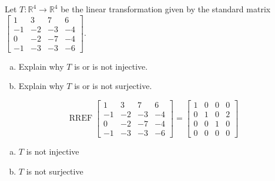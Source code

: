 
\begin{exerciseStatement}
 Let \(T:\mathbb{R}^ 4  \to \mathbb{R}^ 4 \) be the linear transformation given by the standard matrix \( \left[\begin{array}{cccc}
1 & 3 & 7 & 6 \\
-1 & -2 & -3 & -4 \\
0 & -2 & -7 & -4 \\
-1 & -3 & -3 & -6
\end{array}\right] .\)
\begin{enumerate}[(a)]
\item Explain why \(T\) is or is not injective.
\item Explain why \(T\) is or is not surjective.
\end{enumerate}
    
\end{exerciseStatement}
    
\begin{exerciseAnswer} 


\[\operatorname{RREF} \left[\begin{array}{cccc}
1 & 3 & 7 & 6 \\
-1 & -2 & -3 & -4 \\
0 & -2 & -7 & -4 \\
-1 & -3 & -3 & -6
\end{array}\right] = \left[\begin{array}{cccc}
1 & 0 & 0 & 0 \\
0 & 1 & 0 & 2 \\
0 & 0 & 1 & 0 \\
0 & 0 & 0 & 0
\end{array}\right] \]


\begin{enumerate}[(a)]
\item \(T\) is not injective
\item \(T\) is not surjective
\end{enumerate}
    
\end{exerciseAnswer}
    
